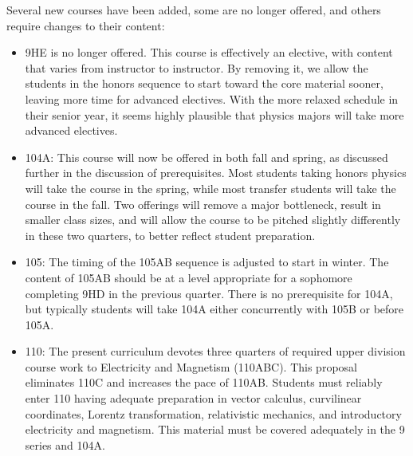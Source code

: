 \documentclass[12pt]{article}
\begin{document}
Several new courses have been added, some are no longer offered, and
others require changes to their content:
\begin{itemize}

\item 9HE is no longer offered.  This course is effectively an
  elective, with content that varies from instructor to instructor.
  By removing it, we allow the students in the honors sequence to
  start toward the core material sooner, leaving more time for
  advanced electives. With the more relaxed schedule in their senior
  year, it seems highly plausible that physics majors will take more
  advanced electives.

\item 104A: This course will now be offered in both fall and spring,
  as discussed further in the discussion of prerequisites.  Most
  students taking honors physics will take the course in the spring,
  while most transfer students will take the course in the fall.  Two
  offerings will remove a major bottleneck, result in smaller class sizes,
  and will allow the course to be pitched slightly differently in
  these two quarters, to better reflect student preparation.

\item 105: The timing of the 105AB sequence is adjusted to start in
  winter.  The content of 105AB should be at a level appropriate for a
  sophomore completing 9HD in the previous quarter.  There is no prerequisite for
  104A, but typically students will take 104A either concurrently with
  105B or before 105A.

\item 110: The present curriculum devotes three quarters of required
  upper division course work to Electricity and Magnetism (110ABC).
  This proposal eliminates 110C and increases the pace of 110AB.
  Students must reliably enter 110 having adequate preparation in
  vector calculus, curvilinear coordinates, Lorentz transformation,
  relativistic mechanics, and introductory electricity and magnetism.
  This material must be covered adequately in the 9 series and 104A.



\end{itemize}
\end{document}
